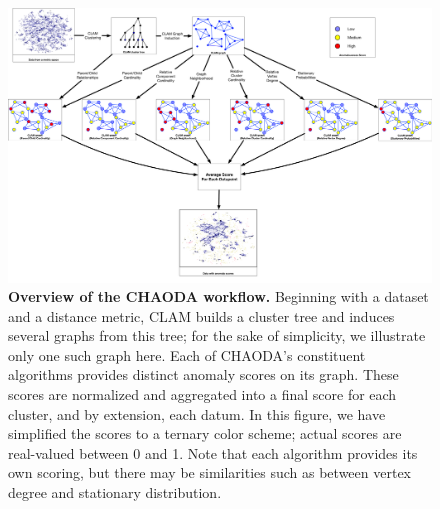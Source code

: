 \begin{figure}[ht!]
    \centering
    \includegraphics[width=6in]{images/chaoda-workflow.pdf}
    \caption{\textbf{Overview of the CHAODA workflow.}
        Beginning with a dataset and a distance metric, CLAM builds a cluster tree and induces several graphs from this tree; for the sake of simplicity, we illustrate only one such graph here.
        Each of CHAODA's constituent algorithms provides distinct anomaly scores on its graph.
        These scores are normalized and aggregated into a final score for each cluster, and by extension, each datum.
        In this figure, we have simplified the scores to a ternary color scheme; actual scores are real-valued between 0 and 1.
        Note that each algorithm provides its own scoring, but there may be similarities such as between vertex degree and stationary distribution.}
    \label{fig:methods:chaoda-workflow}
\end{figure}





